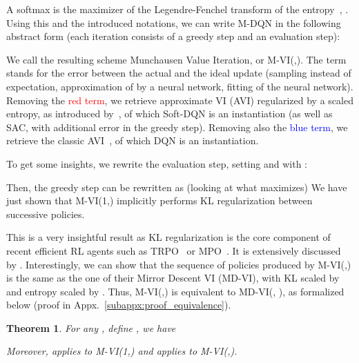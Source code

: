 \documentclass{article}
\newtheorem{theorem}{Theorem}
\begin{document}
A softmax is the maximizer of the Legendre-Fenchel transform of the entropy~\cite{boyd2004convex,vieillard2020leverage}, . Using this and the introduced notations, we can write M-DQN in the following abstract form (each iteration consists of a greedy step and an evaluation step):

We call the resulting scheme Munchausen Value Iteration, or M-VI(,). The term  stands for the error between the actual and the ideal update (sampling instead of expectation, approximation of  by a neural network, fitting of the neural network). Removing the \textcolor{red}{red term}, we retrieve approximate VI (AVI) regularized by a scaled entropy, as introduced by~\citet{geist2019theory}, of which Soft-DQN is an instantiation (as well as SAC, with additional error in the greedy step). Removing also the \textcolor{blue}{blue term}, we retrieve the classic AVI~\cite{scherrer2015approximate}, of which DQN is an instantiation.

To get some insights, we rewrite the evaluation step, setting  and with :

Then, the greedy step can be rewritten as (looking at what  maximizes)
We have just shown that M-VI(1,) implicitly performs KL regularization between successive policies. 

This is a very insightful result as KL regularization is the core component of recent efficient RL agents such as TRPO~\cite{schulman2015trust} or MPO~\cite{abdolmaleki2018maximum}. It is extensively discussed by \citet{vieillard2020leverage}. Interestingly, we can show that the sequence of policies produced by M-VI(,) is the same as the one of their Mirror Descent VI (MD-VI), with KL scaled by  and entropy scaled by . Thus, M-VI(,) is equivalent to MD-VI(, ), as formalized below (proof in Appx.~\ref{subappx:proof_equivalence}).
\begin{theorem}
\label{thm:equivalence}
    For any , define , we have
    
    Moreover, \cite[Thm.~1]{vieillard2020leverage} applies to M-VI(1,) and \cite[Thm.~2]{vieillard2020leverage} applies to M-VI(,).\end{theorem}
\end{document}
